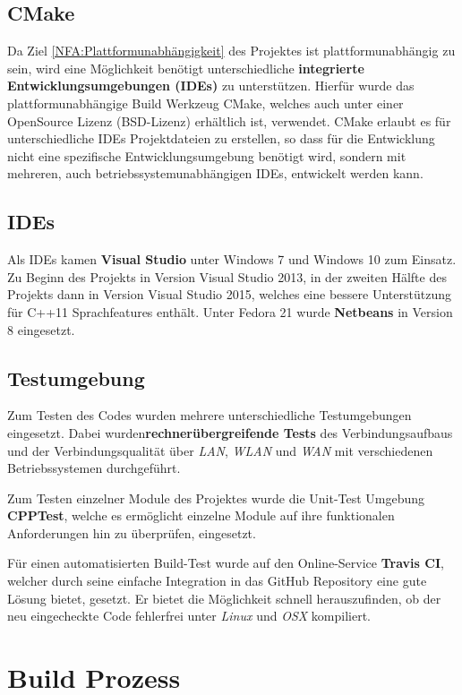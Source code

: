 \subsection{CMake}
Da Ziel \ref{NFA:Plattformunabhängigkeit} des Projektes ist plattformunabhängig zu sein, wird eine Möglichkeit benötigt unterschiedliche \textbf{integrierte Entwicklungsumgebungen (IDEs)} zu unterstützen.
Hierfür wurde das plattformunabhängige Build Werkzeug CMake, welches auch unter einer OpenSource Lizenz (BSD-Lizenz) erhältlich ist, verwendet. CMake erlaubt es für unterschiedliche IDEs Projektdateien zu erstellen, so dass für die Entwicklung nicht eine spezifische Entwicklungsumgebung benötigt wird, sondern mit mehreren, auch betriebssystemunabhängigen IDEs, entwickelt werden kann.

\subsection{IDEs}
Als IDEs kamen \textbf{Visual Studio} unter Windows 7 und Windows 10 zum Einsatz. Zu Beginn des Projekts in Version Visual Studio 2013, in der zweiten Hälfte des Projekts dann in Version Visual Studio 2015, welches eine bessere Unterstützung für C++11 Sprachfeatures enthält. Unter Fedora 21 wurde \textbf{Netbeans} in Version 8 eingesetzt.

\subsection{Testumgebung}
Zum Testen des Codes wurden mehrere unterschiedliche Testumgebungen eingesetzt. Dabei wurden\textbf{rechnerübergreifende Tests} des Verbindungsaufbaus und der Verbindungsqualität über \textit{LAN}, \textit{WLAN} und \textit{WAN} mit verschiedenen Betriebssystemen durchgeführt. 

Zum Testen einzelner Module des Projektes wurde die Unit-Test Umgebung \textbf{CPPTest}, welche es ermöglicht einzelne Module auf ihre funktionalen Anforderungen hin zu überprüfen, eingesetzt. 

Für einen automatisierten Build-Test wurde auf den Online-Service \textbf{Travis CI}, welcher durch seine einfache Integration in das GitHub Repository eine gute Lösung bietet, gesetzt. Er bietet die Möglichkeit schnell herauszufinden, ob der neu eingecheckte Code fehlerfrei unter \textit{Linux} und \textit{OSX} kompiliert.

\section{Build Prozess}
